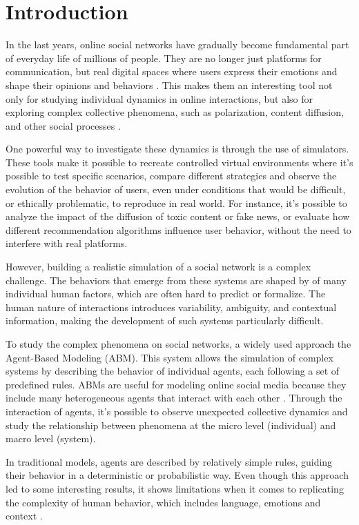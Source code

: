 \section{Introduction}
\label{sec:introduction}

In the last years, online social networks have gradually become fundamental part of everyday life of millions of people.
They are no longer just platforms for communication, but real digital spaces where users express their emotions and shape their opinions and behaviors \cite{bakshy2015}.
This makes them an interesting tool not only for studying individual dynamics in online interactions, but also for exploring complex collective phenomena, such as polarization, content diffusion, and other social processes \cite{vosoughi2018spread}.

\medskip
One powerful way to investigate these dynamics is through the use of simulators.
These tools make it possible to recreate controlled virtual environments where it's possible to test specific scenarios, compare different strategies and observe the evolution of the behavior of users, even under conditions that would be difficult, or ethically problematic, to reproduce in real world.
For instance, it's possible to analyze the impact of the diffusion of toxic content or fake news, or evaluate how different recommendation algorithms influence user behavior, without the need to interfere with real platforms.

However, building a realistic simulation of a social network is a complex challenge.
The behaviors that emerge from these systems are shaped by of many individual human factors, which are often hard to predict or formalize.
The human nature of interactions introduces variability, ambiguity, and contextual information, making the development of such systems particularly difficult.


\medskip
To study the complex phenomena on social networks, a widely used approach the Agent-Based Modeling (ABM).
This system allows the simulation of complex systems by describing the behavior of individual agents, each following a set of predefined rules.
ABMs are useful for modeling online social media because they include many heterogeneous agents that interact with each other \cite{gausen2021can}.
Through the interaction of agents, it's possible to observe unexpected collective dynamics and study the relationship between phenomena at the micro level (individual) and macro level (system).

In traditional models, agents are described by relatively simple rules, guiding their behavior in a deterministic or probabilistic way.
Even though this approach led to some interesting results, it shows limitations when it comes to replicating the complexity of human behavior, which includes language, emotions and context \cite{conte2014agent, törnberg2023evaluate}.

